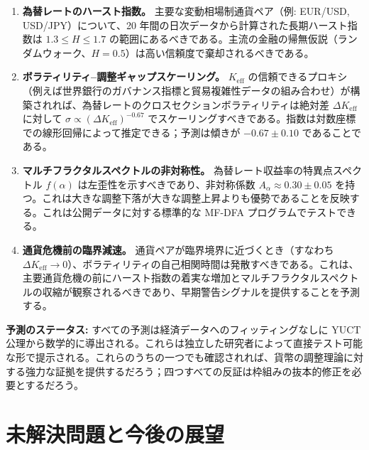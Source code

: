 \documentclass[12pt,a4paper]{article}
\theoremstyle{remark}
\begin{document}
	\begin{enumerate}[label=(\arabic*)]
		\item \textbf{為替レートのハースト指数。} 主要な変動相場制通貨ペア（例: EUR/USD, USD/JPY）について、20 年間の日次データから計算された長期ハースト指数は \(1.3 \le H \le 1.7\) の範囲にあるべきである。主流の金融の帰無仮説（ランダムウォーク、\(H = 0.5\)）は高い信頼度で棄却されるべきである。
		
		\item \textbf{ボラティリティ–調整ギャップスケーリング。} \(K_{\mathrm{eff}}\) の信頼できるプロキシ（例えば世界銀行のガバナンス指標と貿易複雑性データの組み合わせ）が構築されれば、為替レートのクロスセクションボラティリティは絶対差 \(\Delta K_{\mathrm{eff}}\) に対して \(\sigma \propto (\Delta K_{\mathrm{eff}})^{-0.67}\) でスケーリングすべきである。指数は対数座標での線形回帰によって推定できる；予測は傾きが \(-0.67 \pm 0.10\) であることである。
		
		\item \textbf{マルチフラクタルスペクトルの非対称性。} 為替レート収益率の特異点スペクトル \(f(\alpha)\) は左歪性を示すべきであり、非対称係数 \(A_\alpha \approx 0.30 \pm 0.05\) を持つ。これは大きな調整下落が大きな調整上昇よりも優勢であることを反映する。これは公開データに対する標準的な MF-DFA プログラムでテストできる。
		
		\item \textbf{通貨危機前の臨界減速。} 通貨ペアが臨界境界に近づくとき（すなわち \(\Delta K_{\mathrm{eff}} \to 0\)）、ボラティリティの自己相関時間は発散すべきである。これは、主要通貨危機の前にハースト指数の着実な増加とマルチフラクタルスペクトルの収縮が観察されるべきであり、早期警告シグナルを提供することを予測する。
	\end{enumerate}
	
	\textbf{予測のステータス:} すべての予測は経済データへのフィッティングなしに YUCT 公理から数学的に導出される。これらは独立した研究者によって直接テスト可能な形で提示される。これらのうちの一つでも確認されれば、貨幣の調整理論に対する強力な証拠を提供するだろう；四つすべての反証は枠組みの抜本的修正を必要とするだろう。
	
	\section{未解決問題と今後の展望}
	
\end{document}
